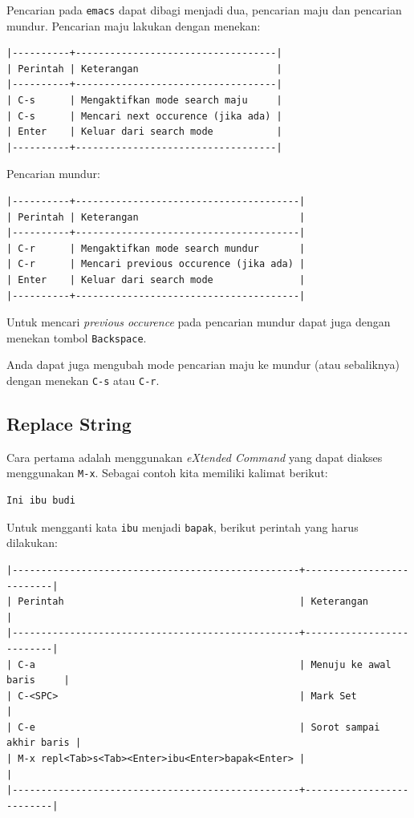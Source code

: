 \documentclass{article}
\begin{document}
Pencarian pada \verb=emacs= dapat dibagi menjadi dua, pencarian maju dan 
pencarian mundur. Pencarian maju lakukan dengan menekan:

\begin{verbatim}
|----------+-----------------------------------|
| Perintah | Keterangan                        |
|----------+-----------------------------------|
| C-s      | Mengaktifkan mode search maju     |
| C-s      | Mencari next occurence (jika ada) |
| Enter    | Keluar dari search mode           |
|----------+-----------------------------------|
\end{verbatim}

Pencarian mundur:

\begin{verbatim}
|----------+---------------------------------------|
| Perintah | Keterangan                            |
|----------+---------------------------------------|
| C-r      | Mengaktifkan mode search mundur       |
| C-r      | Mencari previous occurence (jika ada) |
| Enter    | Keluar dari search mode               |
|----------+---------------------------------------|
\end{verbatim}

Untuk mencari \emph{previous occurence} pada pencarian mundur dapat juga
dengan menekan tombol \verb=Backspace=.

Anda dapat juga mengubah mode pencarian maju ke mundur (atau sebaliknya)
dengan menekan \verb=C-s= atau \verb=C-r=.

\subsection{Replace String}

Cara pertama adalah menggunakan \emph{eXtended Command} yang dapat diakses
menggunakan \verb=M-x=. Sebagai contoh kita memiliki kalimat berikut:

\begin{verbatim}
Ini ibu budi
\end{verbatim}

Untuk mengganti kata \verb=ibu= menjadi \verb=bapak=, berikut perintah yang
harus dilakukan:

\begin{verbatim}
|--------------------------------------------------+--------------------------|
| Perintah                                         | Keterangan               |
|--------------------------------------------------+--------------------------|
| C-a                                              | Menuju ke awal baris     |
| C-<SPC>                                          | Mark Set                 |
| C-e                                              | Sorot sampai akhir baris |
| M-x repl<Tab>s<Tab><Enter>ibu<Enter>bapak<Enter> |                          |
|--------------------------------------------------+--------------------------|
\end{verbatim}
\end{document}
